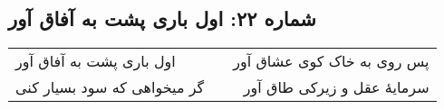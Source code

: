 \begin{center}
\section*{شماره ۲۲: اول باری پشت به آفاق آور}
\label{sec:022}
\begin{longtable}{l p{0.5cm} r}
اول باری پشت به آفاق آور
&&
پس روی به خاک کوی عشاق آور
\\
گر میخواهی که سود بسیار کنی
&&
سرمایهٔ عقل و زیرکی طاق آور
\\
\end{longtable}
\end{center}
